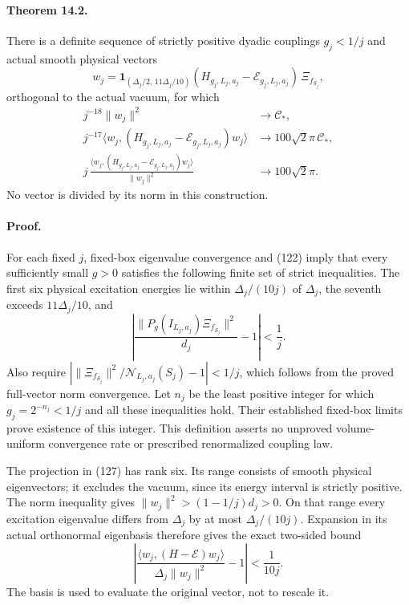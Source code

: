 \documentclass[11pt]{article}
\begin{document}
\paragraph{Theorem 14.2.}
There is a definite sequence of strictly positive dyadic couplings
$g_j<1/j$ and actual smooth physical vectors
\begin{equation}\label{eq:low-actual-vector}
 w_j=\mathbf1_{(\Delta_j/2,\,11\Delta_j/10)}
        (H_{g_j,L_j,a_j}-\mathcal E_{g_j,L_j,a_j})
        \,\Xi_{f_{S_j}},
\end{equation}
orthogonal to the actual vacuum, for which
\begin{align}
 j^{-18}\|w_j\|^2&\longrightarrow\mathcal C_*,
 \label{eq:low-raw-norm}\\
 j^{-17}\langle w_j,(H_{g_j,L_j,a_j}-\mathcal E_{g_j,L_j,a_j})w_j\rangle
 &\longrightarrow100\sqrt2\pi\,\mathcal C_*,
 \label{eq:low-raw-energy}\\
 j\,\frac{\langle w_j,(H_{g_j,L_j,a_j}-\mathcal E_{g_j,L_j,a_j})w_j\rangle}
               {\|w_j\|^2}
 &\longrightarrow100\sqrt2\pi .
 \label{eq:low-quotient}
\end{align}
No vector is divided by its norm in this construction.


\paragraph{Proof.}
For each fixed $j$, fixed-box eigenvalue convergence and
(122) imply that every sufficiently small $g>0$
satisfies the following finite set of strict inequalities.
The first six physical excitation energies lie within
$\Delta_j/(10j)$ of $\Delta_j$, the seventh exceeds
$11\Delta_j/10$, and
\[
 \left|\frac{\|P_g(I_{L_j,a_j})\Xi_{f_{S_j}}\|^2}{d_j}-1\right|<\frac1j.
\]
Also require
$|\|\Xi_{f_{S_j}}\|^2/\mathcal N_{L_j,a_j}(S_j)-1|<1/j$,
which follows from the proved full-vector norm convergence.
Let $n_j$ be the least positive integer for which $g_j=2^{-n_j}<1/j$
and all these inequalities hold. Their established fixed-box limits
prove existence of this integer. This definition asserts no unproved
volume-uniform convergence rate or prescribed renormalized coupling law.

The projection in (127) has rank six.
Its range consists of smooth physical eigenvectors; it excludes the
vacuum, since its energy interval is strictly positive.
The norm inequality gives $\|w_j\|^2>(1-1/j)d_j>0$.
On that range every excitation eigenvalue differs from $\Delta_j$
by at most $\Delta_j/(10j)$. Expansion in its actual orthonormal
eigenbasis therefore gives the exact two-sided bound
\[
 \left|
 \frac{\langle w_j,(H-\mathcal E)w_j\rangle}{\Delta_j\|w_j\|^2}-1
 \right|<\frac1{10j}.
\]
The basis is used to evaluate the original vector, not to rescale it.
\end{document}
